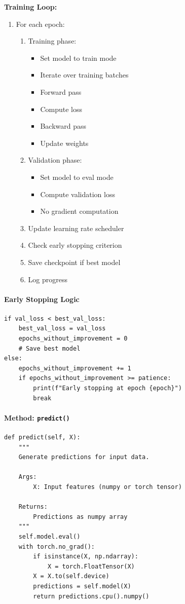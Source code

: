 \documentclass[11pt,a4paper]{article}
\begin{document}
\textbf{Training Loop:}
\begin{enumerate}
    \item For each epoch:
    \begin{enumerate}
        \item Training phase:
        \begin{itemize}
            \item Set model to train mode
            \item Iterate over training batches
            \item Forward pass
            \item Compute loss
            \item Backward pass
            \item Update weights
        \end{itemize}
        \item Validation phase:
        \begin{itemize}
            \item Set model to eval mode
            \item Compute validation loss
            \item No gradient computation
        \end{itemize}
        \item Update learning rate scheduler
        \item Check early stopping criterion
        \item Save checkpoint if best model
        \item Log progress
    \end{enumerate}
\end{enumerate}

\paragraph{Early Stopping Logic}
\begin{lstlisting}
if val_loss < best_val_loss:
    best_val_loss = val_loss
    epochs_without_improvement = 0
    # Save best model
else:
    epochs_without_improvement += 1
    if epochs_without_improvement >= patience:
        print(f"Early stopping at epoch {epoch}")
        break
\end{lstlisting}

\paragraph{Method: \texttt{predict()}}
\begin{lstlisting}
def predict(self, X):
    """
    Generate predictions for input data.

    Args:
        X: Input features (numpy or torch tensor)

    Returns:
        Predictions as numpy array
    """
    self.model.eval()
    with torch.no_grad():
        if isinstance(X, np.ndarray):
            X = torch.FloatTensor(X)
        X = X.to(self.device)
        predictions = self.model(X)
        return predictions.cpu().numpy()
\end{lstlisting}
\end{document}
